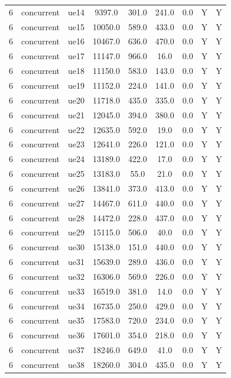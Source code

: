\begin{table}[ht]
\begin{tabular}{|c|c|c|c|c|c|c|c|c|}
6 & concurrent & ue14 & 9397.0 & 301.0 & 241.0 & 0.0 & Y & Y \\
6 & concurrent & ue15 & 10050.0 & 589.0 & 433.0 & 0.0 & Y & Y \\
6 & concurrent & ue16 & 10467.0 & 636.0 & 470.0 & 0.0 & Y & Y \\
6 & concurrent & ue17 & 11147.0 & 966.0 & 16.0 & 0.0 & Y & Y \\
6 & concurrent & ue18 & 11150.0 & 583.0 & 143.0 & 0.0 & Y & Y \\
6 & concurrent & ue19 & 11152.0 & 224.0 & 141.0 & 0.0 & Y & Y \\
6 & concurrent & ue20 & 11718.0 & 435.0 & 335.0 & 0.0 & Y & Y \\
6 & concurrent & ue21 & 12045.0 & 394.0 & 380.0 & 0.0 & Y & Y \\
6 & concurrent & ue22 & 12635.0 & 592.0 & 19.0 & 0.0 & Y & Y \\
6 & concurrent & ue23 & 12641.0 & 226.0 & 121.0 & 0.0 & Y & Y \\
6 & concurrent & ue24 & 13189.0 & 422.0 & 17.0 & 0.0 & Y & Y \\
6 & concurrent & ue25 & 13183.0 & 55.0 & 21.0 & 0.0 & Y & Y \\
6 & concurrent & ue26 & 13841.0 & 373.0 & 413.0 & 0.0 & Y & Y \\
6 & concurrent & ue27 & 14467.0 & 611.0 & 440.0 & 0.0 & Y & Y \\
6 & concurrent & ue28 & 14472.0 & 228.0 & 437.0 & 0.0 & Y & Y \\
6 & concurrent & ue29 & 15115.0 & 506.0 & 40.0 & 0.0 & Y & Y \\
6 & concurrent & ue30 & 15138.0 & 151.0 & 440.0 & 0.0 & Y & Y \\
6 & concurrent & ue31 & 15639.0 & 289.0 & 436.0 & 0.0 & Y & Y \\
6 & concurrent & ue32 & 16306.0 & 569.0 & 226.0 & 0.0 & Y & Y \\
6 & concurrent & ue33 & 16519.0 & 381.0 & 14.0 & 0.0 & Y & Y \\
6 & concurrent & ue34 & 16735.0 & 250.0 & 429.0 & 0.0 & Y & Y \\
6 & concurrent & ue35 & 17583.0 & 720.0 & 234.0 & 0.0 & Y & Y \\
6 & concurrent & ue36 & 17601.0 & 354.0 & 218.0 & 0.0 & Y & Y \\
6 & concurrent & ue37 & 18246.0 & 649.0 & 41.0 & 0.0 & Y & Y \\
6 & concurrent & ue38 & 18260.0 & 304.0 & 435.0 & 0.0 & Y & Y \\

\end{tabular}
\end{table}

